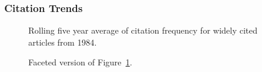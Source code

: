 \documentclass[
  10pt,
  letterpaper,
  DIV=11,
  numbers=noendperiod,
  twoside]{scrartcl}
\begin{document}
\subsubsection*{Citation Trends}\label{sec-trends-1984}

\begin{figure}


\caption{\label{fig-citation-spaghetti-1984}Rolling five year average of
citation frequency for widely cited articles from 1984.}

\end{figure}%

\begin{figure}


\caption{\label{fig-citation-facet-1984}Faceted version of
Figure~\ref{fig-citation-spaghetti-1984}.}

\end{figure}%
\end{document}
